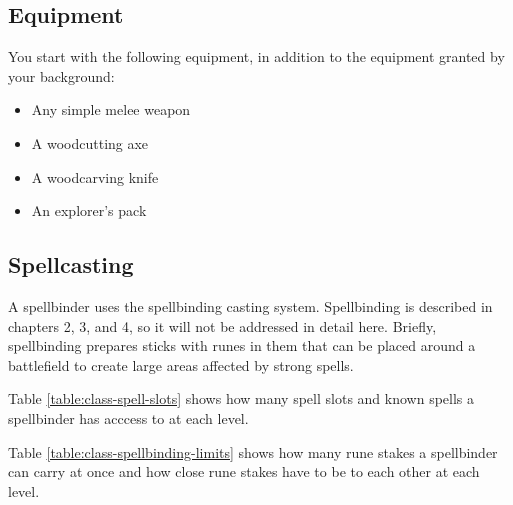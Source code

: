\subsection{Equipment}
You start with the following equipment, in addition to the equipment granted by your background:

\begin{itemize}
    \item Any simple melee weapon
    \item A woodcutting axe
    \item A woodcarving knife
    \item An explorer's pack
\end{itemize}

\subsection{Spellcasting}
A spellbinder uses the spellbinding casting system. Spellbinding is described in chapters 2, 3, and 4, so it will not be addressed in detail here. Briefly, spellbinding prepares sticks with runes in them that can be placed around a battlefield to create large areas affected by strong spells.

Table \ref{table:class-spell-slots} shows how many spell slots and known spells a spellbinder has acccess to at each level.

Table \ref{table:class-spellbinding-limits} shows how many rune stakes a spellbinder can carry at once and how close rune stakes have to be to each other at each level.

